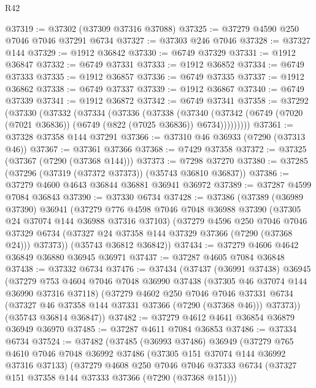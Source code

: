 \begin{lexlean}{R42}
\begin{coremodule}
{@37319 := @37302 (@37309 @37316 @37088)
@37325 := @37279 @4590 @250 @7046 @7046 @37291 @6734
@37327 := @37303 @246 @7046
@37328 := @37327 @144
@37329 := @1912 @36842
@37330 := @6749 @37329
@37331 := @1912 @36847
@37332 := @6749 @37331
@37333 := @1912 @36852
@37334 := @6749 @37333
@37335 := @1912 @36857
@37336 := @6749 @37335
@37337 := @1912 @36862
@37338 := @6749 @37337
@37339 := @1912 @36867
@37340 := @6749 @37339
@37341 := @1912 @36872
@37342 := @6749 @37341
@37358 := @37292
    (@37330
      (@37332
        (@37334
          (@37336
            (@37338
              (@37340
                (@37342 (@6749 (@7020 (@7021 @36836)) (@6749 (@822 (@7025 @36836)) @6734)))))))))
@37361 := @37328 @37358 @144 @37291
@37366 := @37310 @46 @36933 (@7290 (@37313 @46))
@37367 := @37361 @37366
@37368 := @7429 @37358
@37372 := @37325 (@37367 (@7290 (@37368 @144)))
@37373 := @7298 @37270
@37380 := @37285 (@37296 (@37319 (@37372 @37373)) (@35743 @36810 @36837))
@37386 := @37279 @4600 @4643 @36844 @36881 @36941 @36972
@37389 := @37287 @4599 @7084 @36843
@37390 := @37330 @6734
@37428 := @37386
    (@37389
      (@36989 @37390)
      @36941
      (@37279
        @776
        @4598
        @7046
        @7048
        @36988
        @37390
        (@37305 @24 @37074 @144 @36988 @37316 @37103)
        (@37279
          @4596
          @250
          @7046
          @7046
          @37329
          @6734
          (@37327 @24 @37358 @144 @37329 @37366 (@7290 (@37368 @24)))
          @37373))
      (@35743 @36812 @36842))
@37434 := @37279 @4606 @4642 @36849 @36880 @36945 @36971
@37437 := @37287 @4605 @7084 @36848
@37438 := @37332 @6734
@37476 := @37434
    (@37437
      (@36991 @37438)
      @36945
      (@37279
        @753
        @4604
        @7046
        @7048
        @36990
        @37438
        (@37305 @46 @37074 @144 @36990 @37316 @37118)
        (@37279
          @4602
          @250
          @7046
          @7046
          @37331
          @6734
          (@37327 @46 @37358 @144 @37331 @37366 (@7290 (@37368 @46)))
          @37373))
      (@35743 @36814 @36847))
@37482 := @37279 @4612 @4641 @36854 @36879 @36949 @36970
@37485 := @37287 @4611 @7084 @36853
@37486 := @37334 @6734
@37524 := @37482
    (@37485
      (@36993 @37486)
      @36949
      (@37279
        @765
        @4610
        @7046
        @7048
        @36992
        @37486
        (@37305 @151 @37074 @144 @36992 @37316 @37133)
        (@37279
          @4608
          @250
          @7046
          @7046
          @37333
          @6734
          (@37327 @151 @37358 @144 @37333 @37366 (@7290 (@37368 @151)))
}
\end{coremodule}
\end{lexlean}
